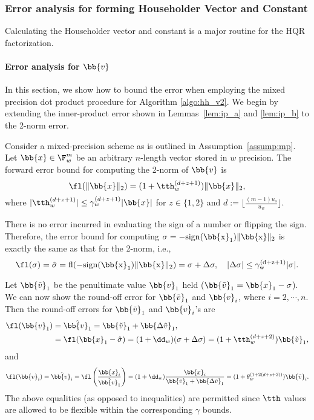 \subsubsection{Error analysis for forming Householder Vector and Constant}
Calculating the Householder vector and constant is a major routine for the HQR factorization. 

\paragraph{Error analysis for $\bb{v}$}
In this section, we show how to bound the error when employing the mixed precision dot product procedure for Algorithm \ref{algo:hh_v2}.
We begin by extending the inner-product error shown in Lemmas~\ref{lem:ip_a} and \ref{lem:ip_b} to the 2-norm error. 
\par

\begin{lemma}
	\label{lem:2norm_a}
	Consider a mixed-precision scheme as is outlined in Assumption~\ref{assump:mp}.
	Let $\bb{x}\in \F_w^{m}$ be an arbitrary $n$-length vector stored in $w$ precision.
	The forward error bound for computing the 2-norm of $\bb{v}$ is
	\begin{equation}
	\fl(\|\bb{x}\|_2)= (1+\tth_w^{(d+z+1)})\|\bb{x}\|_2,
	\end{equation}
	where $|\tth_w^{(d+z+1)}|\leq \gamma_w^{(d+z+1)}|\bb{x}|$ for $z\in\{1,2\}$ and $d:=\lfloor\frac{(m-1)u_s}{u_w}\rfloor$.
\end{lemma} 
There is no error incurred in evaluating the sign of a number or flipping the sign. 
Therefore, the error bound for computing $\sigma = -\rm{sign}(\bb{x}_1)\|\bb{x}\|_2$ is exactly the same as that for the 2-norm, i.e.,
\begin{equation}
\label{eqn:sigma}
\fl(\sigma) = \hat{\sigma} = \rm{fl}(-\rm{sign}(\bb{x}_1)\|\bb{x}\|_2) = \sigma + \Delta \sigma,\quad |\Delta\sigma| \leq \gamma_w^{(d+z+1)}|\sigma|.
\end{equation}

Let $\bb{\tilde{v}}_1$ be the penultimate value $\bb{v}_1$ held ($\bb{\tilde{v}}_1 = \bb{x}_1-\sigma$).
We can now show the round-off error for $\bb{\tilde{v}}_1$ and $\bb{v}_i$, where $i=2 , \cdots, n$. 
Then the round-off errors for $\bb{\tilde{v}}_1$ and $\bb{v}_i$'s are
\begin{align*}
\fl(\bb{v}_1)&=\hat{\bb{v}_1} = \bb{\tilde{v}}_1 + \bb{\Delta \tilde{v}}_1, \\
&= \fl(\bb{x}_1-\hat{\sigma})= (1+\dd_w) (\sigma + \Delta\sigma) = (1+\tth_w^{(d+z+2)})\bb{\tilde{v}}_1,
\end{align*}
and
\begin{equation*}
\fl(\bb{v}_i)=\hat{\bb{v}_i} = \fl\left(\frac{\bb{x}_i}{\hat{\bb{v}_1}}\right) = (1+\dd_w)\frac{\bb{x}_i}{\bb{\tilde{v}}_1 + \bb{\Delta \tilde{v}}_1}=(1+\theta_w^{(1+2(d+z+2))})\bb{\tilde{v}}_i.
\end{equation*}
The above equalities (as opposed to inequalities) are permitted since $\tth$ values are allowed to be flexible within the corresponding $\gamma$ bounds.%

